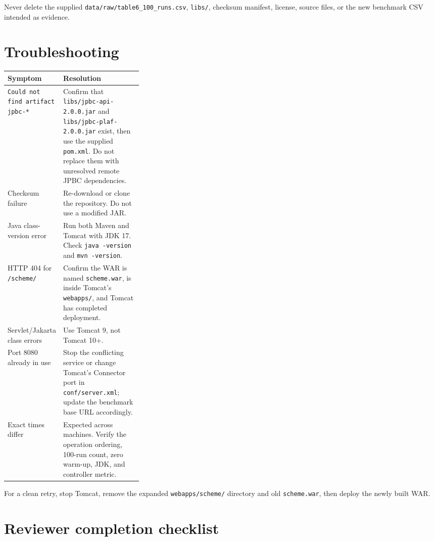 \documentclass[11pt,a4paper]{article}
\begin{document}
Never delete the supplied \texttt{data/raw/table6\_100\_runs.csv}, \texttt{libs/}, checksum manifest, license, source files, or the new benchmark CSV intended as evidence.

\section{Troubleshooting}

\begin{tabularx}{\linewidth}{@{}p{0.31\linewidth}X@{}}
\toprule
\textbf{Symptom} & \textbf{Resolution} \\
\midrule
\texttt{Could not find artifact jpbc-*} & Confirm that \texttt{libs/jpbc-api-2.0.0.jar} and \texttt{libs/jpbc-plaf-2.0.0.jar} exist, then use the supplied \texttt{pom.xml}. Do not replace them with unresolved remote JPBC dependencies. \\
Checksum failure & Re-download or clone the repository. Do not use a modified JAR. \\
Java class-version error & Run both Maven and Tomcat with JDK 17. Check \texttt{java -version} and \texttt{mvn -version}. \\
HTTP 404 for \texttt{/scheme/} & Confirm the WAR is named \texttt{scheme.war}, is inside Tomcat's \texttt{webapps/}, and Tomcat has completed deployment. \\
Servlet/Jakarta class errors & Use Tomcat 9, not Tomcat 10+. \\
Port 8080 already in use & Stop the conflicting service or change Tomcat's Connector port in \texttt{conf/server.xml}; update the benchmark base URL accordingly. \\
Exact times differ & Expected across machines. Verify the operation ordering, 100-run count, zero warm-up, JDK, and controller metric. \\
\bottomrule
\end{tabularx}

For a clean retry, stop Tomcat, remove the expanded \texttt{webapps/scheme/} directory and old \texttt{scheme.war}, then deploy the newly built WAR.

\section{Reviewer completion checklist}
\end{document}
